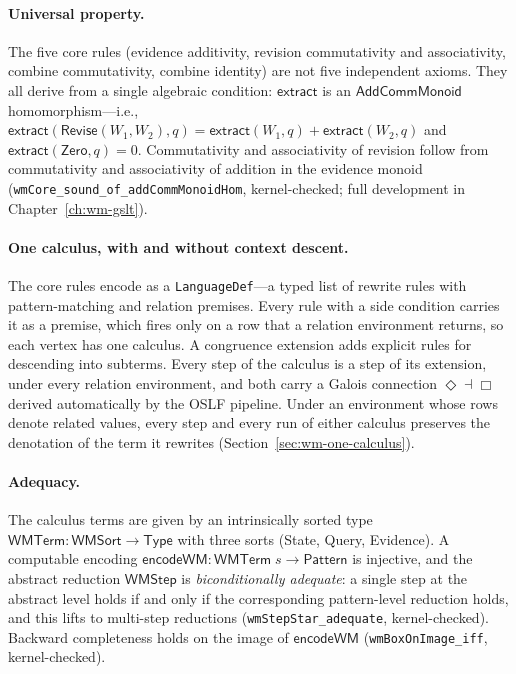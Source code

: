 \documentclass[11pt,openany]{report}
\begin{document}
\paragraph{Universal property.}
The five core rules (evidence additivity, revision commutativity and
associativity, combine commutativity, combine identity) are not five
independent axioms.  They all derive from a single algebraic condition:
$\mathsf{extract}$ is an $\mathsf{AddCommMonoid}$ homomorphism---i.e.,
$\mathsf{extract}(\mathsf{Revise}(W_1,W_2), q) =
\mathsf{extract}(W_1, q) + \mathsf{extract}(W_2, q)$ and
$\mathsf{extract}(\mathsf{Zero}, q) = 0$.  Commutativity and associativity
of revision follow from commutativity and associativity of addition in the
evidence monoid (\texttt{wmCore\_sound\_of\_addCommMonoidHom},
kernel-checked; full development in Chapter~\ref{ch:wm-gslt}).

\paragraph{One calculus, with and without context descent.}
The core rules encode as a \texttt{LanguageDef}---a typed list of
rewrite rules with pattern-matching and relation premises.  Every rule with
a side condition carries it as a premise, which fires only on a row that a
relation environment returns, so each vertex has one calculus.  A congruence
extension adds explicit rules for descending into subterms.  Every step of
the calculus is a step of its extension, under every relation environment,
and both carry a Galois connection $\Diamond \dashv \Box$ derived
automatically by the OSLF pipeline.  Under an environment whose rows denote
related values, every step and every run of either calculus preserves the
denotation of the term it rewrites (Section~\ref{sec:wm-one-calculus}).

\paragraph{Adequacy.}
The calculus terms are given by an intrinsically sorted type
$\mathsf{WMTerm} : \mathsf{WMSort} \to \mathsf{Type}$ with three sorts
(State, Query, Evidence).  A computable encoding
$\mathsf{encodeWM} : \mathsf{WMTerm}\;s \to \mathsf{Pattern}$ is
injective, and the abstract reduction $\mathsf{WMStep}$ is
\emph{biconditionally adequate}: a single step at the abstract level
holds if and only if the corresponding pattern-level reduction holds, and
this lifts to multi-step reductions
(\texttt{wmStepStar\_adequate}, kernel-checked).
Backward completeness holds on the image of $\mathsf{encodeWM}$
(\texttt{wmBoxOnImage\_iff}, kernel-checked).
\end{document}
